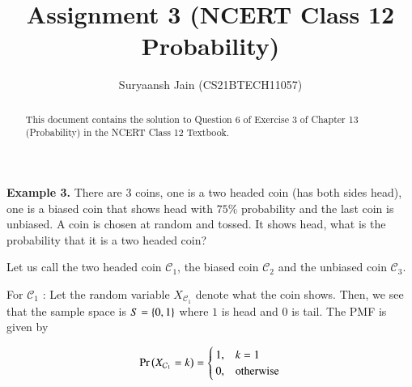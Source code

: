\documentclass[journal,12pt,twocolumn]{IEEEtran}
\begin{document}
\makeatletter
{}
\makeatother
\let\StandardTheFigure\thefigure
\let\vec\mathbf
\renewcommand{\thefigure}{\arabic{figure}}
\def\putbox#1#2#3{\makebox[0in][l]{\makebox[#1][l]{}\raisebox{\baselineskip}[0in][0in]{\raisebox{#2}[0in][0in]{#3}}}}
     \def\rightbox#1{\makebox[0in][r]{#1}}
     \def\centbox#1{\makebox[0in]{#1}}
     \def\topbox#1{\raisebox{-\baselineskip}[0in][0in]{#1}}
     \def\midbox#1{\raisebox{-0.5\baselineskip}[0in][0in]{#1}}
\title{Assignment 3 (NCERT Class 12 Probability)}
\author{Suryaansh Jain (CS21BTECH11057)}	
\maketitle

\begin{abstract}
This document contains the solution to Question 6 of Exercise 3 of Chapter 13 (Probability) in the NCERT Class 12 Textbook. 
\end{abstract}

\noindent \textbf{Example 3.} There are 3 coins, one is a two headed coin (has both sides head), one is a biased coin that shows head with $75\%$ probability and the last coin is unbiased. A coin is chosen at random and tossed. It shows head, what is the probability that it is a two headed coin? \newline

 \solution Let us call the two headed coin $\mathcal{C}_1$, the biased coin $\mathcal{C}_2$ and the unbiased coin $\mathcal{C}_3$. \newline


\noindent For $\mathcal{C}_1$ :
\newline Let the random variable $X_{\mathcal{C}_1}$ denote what the coin shows. Then, we see that the sample space is $S = \left\{0, 1\right\}$ where $1$ is head and $0$ is tail. The PMF is given by

\begin{equation}
\Pr\left(X_{\mathcal{C}_1} = k\right) = 
\begin{cases}
1, & k = 1 \\
0, & \text{otherwise} 
\end{cases}
\label{pmf}
\end{equation}
\end{document}
